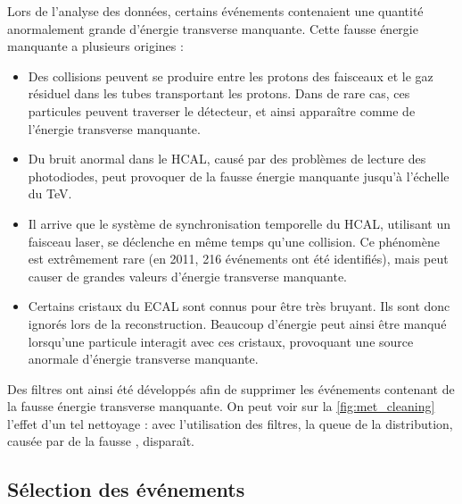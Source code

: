 Lors de l'analyse des données, certains événements contenaient une quantité anormalement grande d'énergie transverse manquante. Cette fausse énergie manquante a plusieurs origines :
\begin{itemize}
  \item Des collisions peuvent se produire entre les protons des faisceaux et le gaz résiduel dans les tubes transportant les protons. Dans de rare cas, ces particules peuvent traverser le détecteur, et ainsi apparaître comme de l'énergie transverse manquante.
  \item Du bruit anormal dans le HCAL, causé par des problèmes de lecture des photodiodes, peut provoquer de la fausse énergie manquante jusqu'à l'échelle du \si{\TeV}.
  \item Il arrive que le système de synchronisation temporelle du HCAL, utilisant un faisceau laser, se déclenche en même temps qu'une collision. Ce phénomène est extrêmement rare (en 2011, 216 événements ont été identifiés), mais peut causer de grandes valeurs d'énergie transverse manquante.
  \item Certains cristaux du ECAL sont connus pour être très bruyant. Ils sont donc ignorés lors de la reconstruction. Beaucoup d'énergie peut ainsi être manqué lorsqu'une particule interagit avec ces cristaux, provoquant une source anormale d'énergie transverse manquante.
\end{itemize}

Des filtres ont ainsi été développés afin de supprimer les événements contenant de la fausse énergie transverse manquante. On peut voir sur la \cref{fig:met_cleaning} l'effet d'un tel nettoyage : avec l'utilisation des filtres, la queue de la distribution, causée par de la fausse \met, disparaît.

\subsection{Sélection des événements}



